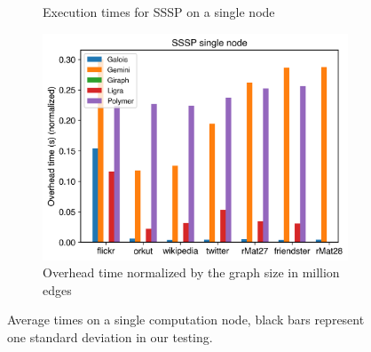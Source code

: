\begin{figure}[t!]
\begin{subfigure}{0.3\textwidth}
		\caption{Execution times for SSSP on a single node}
		\label{fig:singleNodeSSSP_exec}
	\end{subfigure}
	\hfil
	\begin{subfigure}{0.3\textwidth}
		\includegraphics[width=\linewidth]{../../plots/singleNodeSSSP_overheadTimeNormalized.png}
		\caption{Overhead time normalized by the graph size in million edges}
		\label{fig:singleNodeSSSP_overheadNormalized}
	\end{subfigure}
	\caption{Average times on a single computation node, black bars represent one standard deviation in our testing.}
	\label{fig:singleNodeSSSP}
\end{figure}




